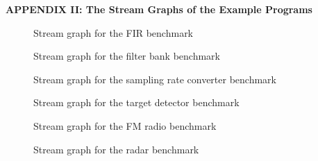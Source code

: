 \newpage
\begin{center}
\large{\bf{APPENDIX II:  The Stream Graphs of the Example Programs}}
\end{center}




\begin{figure}[htbp]
\center
\epsfysize=1.8in
\caption{Stream graph for the FIR benchmark}
\label{fig:stream-graph-fir}
\end{figure}

\begin{figure}[htbp]
\center
\epsfxsize=3.25in
\caption{Stream graph for the filter bank benchmark}
\label{fig:stream-graph-filterbank}
\end{figure}

\begin{figure}[htbp]
\center
\epsfysize=2.5in
\caption{Stream graph for the sampling rate converter benchmark}
\label{fig:stream-graph-samplingrate}
\end{figure}


\begin{figure}[htbp]
\center
\epsfxsize=3.0in
\caption{Stream graph for the target detector benchmark}
\label{fig:stream-graph-target}
\end{figure}

\begin{figure*}[htbp]
\center
\epsfxsize=5.0in
\caption{Stream graph for the FM radio benchmark}
\label{fig:stream-graph-fm}
\end{figure*}

\begin{figure*}[htbp]
\center
\epsfxsize=6.0in
\caption{Stream graph for the radar benchmark}
\label{fig:stream-graph-beamform}
\end{figure*}
